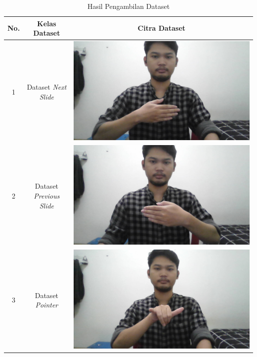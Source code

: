 \begin{longtable}{|c|c|c|}
  \caption{Hasil Pengambilan Dataset}
  \label{tb:Hasil Pengambilan Dataset}\\
  \hline
  \textbf{No.} & \textbf{Kelas Dataset} & \textbf{Citra Dataset} \\
  \hline
  \endhead
  1 & Dataset \emph{Next Slide}  &  \includegraphics[scale=0.2]{gambar/pengambilan-dataset/dataset-next-slide.jpg} \\
  \hline
  2 & Dataset \emph{Previous Slide}  &  \includegraphics[scale=0.2]{gambar/pengambilan-dataset/dataset-previous-slide.jpg} \\
  \hline
  3 & Dataset \emph{Pointer}  &  \includegraphics[scale=0.2]{gambar/pengambilan-dataset/dataset-pointer.jpg} \\

\end{longtable}
